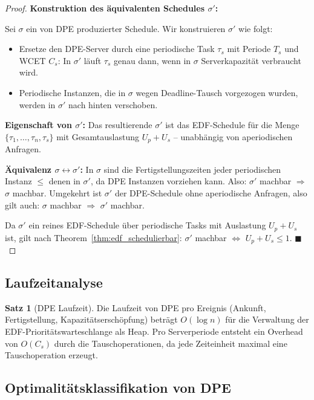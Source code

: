 ﻿\documentclass[a4paper,12pt]{report}
\theoremstyle{definition}
\newtheorem{satz}{Satz}[chapter]
\begin{document}
\begin{proof}
	\textbf{Konstruktion des äquivalenten Schedules $\sigma'$:}

	Sei $\sigma$ ein von DPE produzierter Schedule. Wir konstruieren $\sigma'$
	wie folgt:
	\begin{itemize}
		\item Ersetze den DPE-Server durch eine periodische Task $\tau_s$
		      mit Periode $T_s$ und WCET $C_s$: In $\sigma'$ läuft $\tau_s$ genau dann,
		      wenn in $\sigma$ Serverkapazität verbraucht wird.
		\item Periodische Instanzen, die in $\sigma$ wegen Deadline-Tausch
		      vorgezogen wurden, werden in $\sigma'$ nach hinten verschoben.
	\end{itemize}

	\textbf{Eigenschaft von $\sigma'$:} Das resultierende $\sigma'$ ist das
	EDF-Schedule für die Menge $\{\tau_1,\ldots,\tau_n,\tau_s\}$ mit
	Gesamtauslastung $U_p + U_s$ -- unabhängig von aperiodischen Anfragen.

	\textbf{Äquivalenz $\sigma \leftrightarrow \sigma'$:} In $\sigma$ sind die
	Fertigstellungszeiten jeder periodischen Instanz $\leq$ denen in $\sigma'$,
	da DPE Instanzen vorziehen kann. Also: $\sigma'$ machbar $\Rightarrow$ $\sigma$
	machbar. Umgekehrt ist $\sigma'$ der DPE-Schedule ohne aperiodische Anfragen,
	also gilt auch: $\sigma$ machbar $\Rightarrow$ $\sigma'$ machbar.

	Da $\sigma'$ ein reines EDF-Schedule über periodische Tasks mit Auslastung
	$U_p + U_s$ ist, gilt nach Theorem~\ref{thm:edf_schedulierbar}:
	$\sigma'$ machbar $\iff$ $U_p + U_s \leq 1$. \hfill$\blacksquare$
\end{proof}

\subsection{Laufzeitanalyse}

\begin{satz}[DPE Laufzeit]
	Die Laufzeit von DPE pro Ereignis (Ankunft, Fertigstellung, Kapazitätserschöpfung)
	beträgt $O(\log n)$ für die Verwaltung der EDF-Prioritätswarteschlange als Heap.
	Pro Serverperiode entsteht ein Overhead von $O(C_s)$ durch die Tauschoperationen,
	da jede Zeiteinheit maximal eine Tauschoperation erzeugt.
\end{satz}

\subsection{Optimalitätsklassifikation von DPE}
\end{document}
